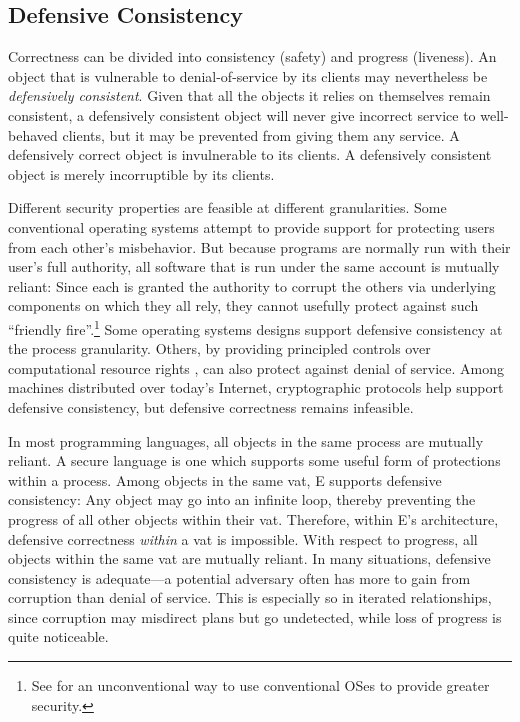 \documentclass{llncs}
\begin{document}
\subsection{Defensive Consistency}

Correctness can be divided into consistency (safety) and progress
(liveness). An object that is vulnerable to denial-of-service by its
clients may nevertheless be \emph{defensively consistent}. Given that
all the objects it relies on themselves remain consistent, a
defensively consistent object will never give incorrect service to
well-behaved clients, but it may be prevented from giving them any
service. A defensively correct object is invulnerable to its
clients. A defensively consistent object is merely incorruptible by
its clients.

Different security properties are feasible at different
granularities. Some conventional operating systems attempt to provide
support for protecting users from each other's misbehavior. But
because programs are normally run with their user's full authority,
all software that is run under the same account is mutually
reliant: Since each is granted the authority to corrupt the others via
underlying components on which they all rely, they cannot usefully
protect against such ``friendly fire''.\footnote{
%
See \cite{stiegler:polaris} for an unconventional way to use
conventional OSes to provide greater security.}
%
Some operating systems designs \cite{dvh} support defensive
consistency at the process granularity. Others, by providing
principled controls over computational resource rights
\cite{hardy:keykos,shapiro:eros}, can also protect against denial of
service. Among machines distributed over today's Internet,
cryptographic protocols help support defensive consistency, but
defensive correctness remains infeasible.

In most programming languages, all objects in the same process are
mutually reliant. A secure language is one which supports some useful
form of protections within a process.  Among objects in the same vat,
E supports defensive consistency: Any object may go into an infinite
loop, thereby preventing the progress of all other objects within
their vat. Therefore, within E's architecture, defensive correctness
\emph{within} a vat is impossible. With respect to progress, all
objects within the same vat are mutually reliant. In many situations,
defensive consistency is adequate---a potential adversary often has
more to gain from corruption than denial of service. This is
especially so in iterated relationships, since corruption may
misdirect plans but go undetected, while loss of progress is quite
noticeable.
\end{document}
